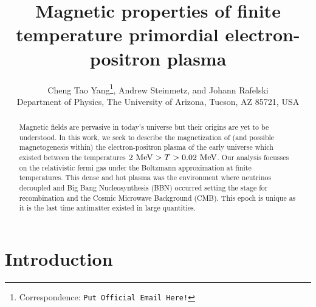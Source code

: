 \documentclass[a4paper]{article}
\title{\boldmath Magnetic properties of finite temperature primordial electron-positron plasma}
\author{Cheng Tao Yang\orc{\orcB}\thanks{Correspondence: \texttt{Put Official Email Here!}}, Andrew Steinmetz\orc{\orcC}, and Johann Rafelski\orc{\orcA}\\ Department of Physics, The University of Arizona, Tucson, AZ 85721, USA}
\begin{document}
\maketitle

\begin{abstract}
    Magnetic fields are pervasive in today's universe but their origins are yet to be understood. In this work, we seek to describe the magnetization of (and possible magnetogenesis within) the electron-positron plasma of the early universe which existed between the temperatures $2\text{ MeV}>T>0.02\text{ MeV}$. Our analysis focusses on the relativistic fermi gas under the Boltzmann approximation at finite temperatures. This dense and hot plasma was the environment where neutrinos decoupled and Big Bang Nucleosynthesis (BBN) occurred setting the stage for recombination and the Cosmic Microwave Background (CMB). This epoch is unique as it is the last time antimatter existed in large quantities.
\end{abstract}


\section{Introduction}\label{sec:Introduction}
\end{document}
